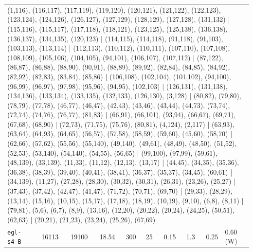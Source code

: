 \begin{longtable}{lrrrrrrrrl}
\multicolumn{10}{p{0.96\linewidth}}{\tiny\raggedright\arraybackslash (1,116), (116,117), (117,119), (119,120), (120,121), (121,122), (122,123), (123,124), (124,126), (126,127), (127,129), (128,129), (127,128), (131,132) | (115,116), (115,117), (117,118), (118,121), (123,125), (125,138), (136,138), (136,137), (134,135), (120,123) | (114,115), (114,118), (91,118), (91,103), (103,113), (113,114) | (112,113), (110,112), (110,111), (107,110), (107,108), (108,109), (105,106), (104,105), (94,101), (106,107), (107,112) | (87,122), (86,87), (86,88), (88,90), (90,91), (88,89), (89,92), (82,84), (84,85), (84,92), (82,92), (82,83), (83,84), (85,86) | (106,108), (102,104), (101,102), (94,100), (96,99), (96,97), (97,98), (95,96), (94,95), (102,103) | (126,131), (131,138), (134,136), (133,134), (133,135), (132,133), (126,130), (3,128) | (80,82), (79,80), (78,79), (77,78), (46,77), (46,47), (42,43), (43,46), (43,44), (44,73), (73,74), (72,74), (74,76), (76,77), (81,83) | (66,91), (66,101), (93,94), (66,67), (69,71), (67,68), (68,90) | (72,73), (71,75), (75,76), (80,81), (4,124), (2,117) | (63,93), (63,64), (64,93), (64,65), (56,57), (57,58), (58,59), (59,60), (45,60), (58,70) | (62,66), (57,62), (55,56), (55,140), (49,140), (49,61), (48,49), (48,50), (51,52), (52,53), (53,140), (54,140), (54,55), (56,65) | (99,100), (97,99), (59,61), (48,139), (33,139), (11,33), (11,12), (12,13), (13,17) | (44,45), (34,35), (35,36), (36,38), (38,39), (39,40), (40,41), (38,41), (36,37), (35,37), (34,45), (60,61) | (34,139), (11,27), (27,28), (28,30), (30,32), (30,31), (26,31), (23,26), (25,27) | (37,43), (37,42), (42,47), (41,47), (71,72), (70,71), (69,70) | (29,33), (28,29), (13,14), (15,16), (10,15), (15,17), (17,18), (18,19), (10,19), (9,10), (6,8), (8,11) | (79,81), (5,6), (6,7), (8,9), (13,16), (12,20), (20,22), (20,24), (24,25), (50,51), (62,63) | (20,21), (21,23), (23,24), (25,26), (67,69)} \\[2pt]
\texttt{egl-s4-B} & 16113 & 19100 & 18.54 & 300 & 25 & 0.15 & 1.3 & 0.25 & 0.60\,(W) \\

\end{longtable}
